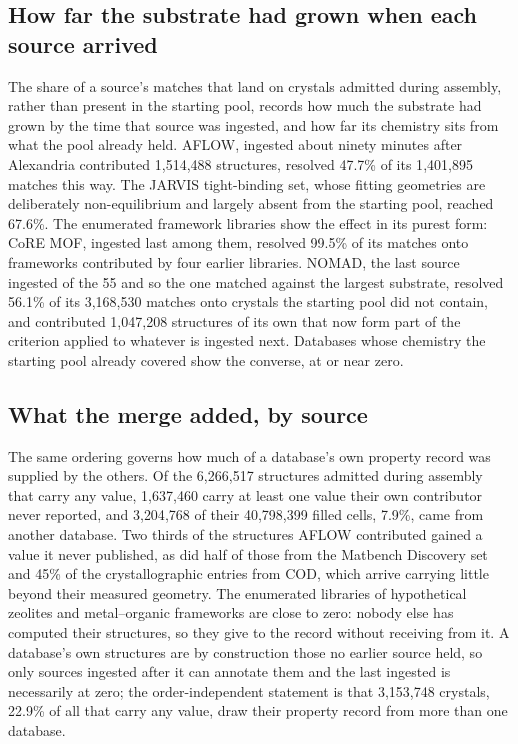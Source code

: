 \subsection{How far the substrate had grown when each source arrived}

The share of a source's matches that land on crystals admitted during assembly,
rather than present in the starting pool, records how much the substrate had
grown by the time that source was ingested, and how far its chemistry sits from
what the pool already held. AFLOW, ingested about ninety minutes after Alexandria
contributed 1{,}514{,}488 structures, resolved 47.7\% of its 1{,}401{,}895
matches this way. The JARVIS tight-binding set, whose fitting geometries are
deliberately non-equilibrium and largely absent from the starting pool, reached
67.6\%. The enumerated framework libraries show the effect in its purest form:
CoRE MOF, ingested last among them, resolved 99.5\% of its matches onto
frameworks contributed by four earlier libraries. NOMAD, the last source ingested
of the 55 and so the one matched against the largest substrate, resolved 56.1\%
of its 3{,}168{,}530 matches onto crystals the starting pool did not contain, and
contributed 1{,}047{,}208 structures of its own that now form part of the
criterion applied to whatever is ingested next. Databases whose chemistry the
starting pool already covered show the converse, at or near zero.

\subsection{What the merge added, by source}

The same ordering governs how much of a database's own property record was
supplied by the others. Of the 6{,}266{,}517 structures admitted during assembly
that carry any value, 1{,}637{,}460 carry at least one value their own
contributor never reported, and 3{,}204{,}768 of their 40{,}798{,}399 filled
cells, 7.9\%, came from another database. Two thirds of the structures AFLOW
contributed gained a value it never published, as did half of those from the
Matbench Discovery set and 45\% of the crystallographic entries from COD, which
arrive carrying little beyond their measured geometry. The enumerated libraries
of hypothetical zeolites and metal--organic frameworks are close to zero: nobody
else has computed their structures, so they give to the record without receiving
from it. A database's own structures are by construction those no earlier source
held, so only sources ingested after it can annotate them and the last ingested
is necessarily at zero; the order-independent statement is that 3{,}153{,}748
crystals, 22.9\% of all that carry any value, draw their property record from
more than one database.

